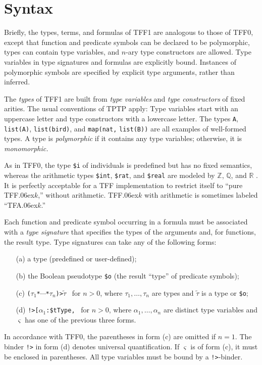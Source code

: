 \section{Syntax} \label{sec_syntax}

Briefly, the types, terms, and formulas of TFF1 are analogous to those of TFF0,
except that function and predicate symbols can be declared to be polymorphic,
types can contain type variables, and $n$-ary type constructors are allowed.
Type variables in type signatures and formulas are explicitly bound. Instances of
polymorphic symbols are specified by explicit type arguments, rather than
inferred.

 The {\em types\/} of TFF1 are built from {\em type
variables\/} and {\em type constructors\/} of fixed arities.
The usual conventions of TPTP
apply: Type variables start with an uppercase letter and type constructors
with a lowercase letter. The types \verb+A+, \verb+list(A)+, \verb+list(bird)+,
and \verb+map(nat,+ \verb+list(B))+ are all examples of well-formed types. A
type is {\em polymorphic} if it contains any type variables; otherwise, it is {\em
monomorphic.}

As in TFF0, the type {\tt \$i} %
of individuals is predefined but has no fixed semantics, whereas the
arithmetic types
{\tt \$int}, {\tt \$rat}, and {\tt \$real} are modeled by $\mathbb{Z}$,
$\mathbb{Q}$, and $\mathbb{R}$ \cite{sutcliffe-et-al-2012-tff0}.
It is perfectly acceptable for a TFF
implementation to restrict itself to ``pure TFF\kern.06ex$k$,''
without arithmetic. %
TFF\kern.06ex$k$ with arithmetic is sometimes labeled ``TFA\kern.06ex$k$.''

Each function and predicate symbol occurring in a formula must be associated
with a {\em type signature\/} that specifies the types of the arguments and, for
functions, the result type. Type signatures can take any of the following forms:
%
\begin{enumerate}
\item[(a)] a type (predefined or user-defined);
\item[(b)] the Boolean pseudotype {\tt \$o}  (the result ``type'' of predicate symbols);
\item[(c)] {\tt ($\tau_1$\;*\;${\cdots}$\;*\;$\tau_n$)\;>\;$\tilde \tau$}
\ for $n > 0$, where $\tau_1,\dots,\tau_n$ are types and $\tilde \tau$ is
a type or {\tt \$o};
\item[(d)] {\tt !>[$\alpha_1$\;:\;\$tType,}\;{\tt ${\dots}$,}\;{\tt
$\alpha_n$\;:\;\$tType]:\;$\varsigma$}
\ for $n > 0$, where $\alpha_1,\dots,\alpha_n$ are distinct
type variables and $\varsigma$ has one of the previous three forms.
\end{enumerate}
%
In accordance with TFF0, the parentheses in form (c) are omitted if $n = 1$.
The binder {\tt !>} in form (d) denotes universal quantification.
If $\varsigma$ is of form (c), it must be enclosed in parentheses.
All type variables must be bound by a {\tt !>}-binder.

